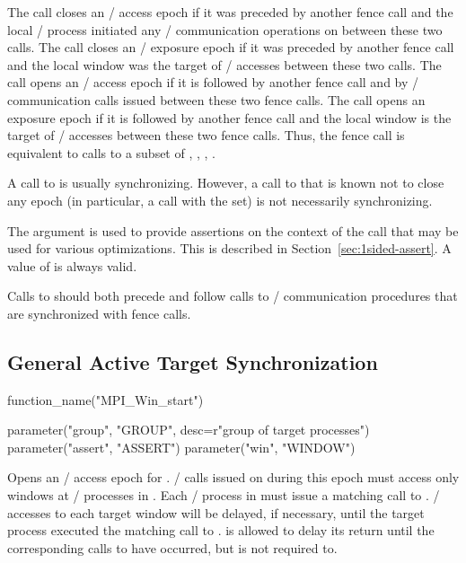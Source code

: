 The call closes an \RMA/ access epoch if it was preceded by
another fence call and the local \mpi/ process initiated any \RMA/ communication
operations on  between these two calls.  The call
closes an \RMA/ exposure epoch if it was
preceded by another fence call and the local window was the target of \RMA/
accesses between these two calls.  The call opens an
\RMA/ access epoch if it is followed by another fence call and by
\RMA/ communication calls issued between these two fence calls.  The
call opens an exposure epoch if it is followed by another fence call
and the local window is the target of \RMA/ accesses between these two fence calls.
Thus, the fence call is equivalent to calls to a subset of
, , , .

A call to  is usually synchronizing.
However, a call to 
that is known not to close any epoch
(in particular, a call with the   set) is
not necessarily synchronizing.

The  argument is used to provide assertions on the
context of the call that may be used for various optimizations.  This
is described in
Section~\ref{sec:1sided-assert}.  A value of  is
always valid.

\begin{users}
Calls to  should both precede and follow calls to
\RMA/ communication procedures that are synchronized with fence calls.
\end{users}

\subsection{General Active Target Synchronization}
\label{sec:1sided-pscw}
\label{sec:1sided-sync:pscw}

%
%
\begin{mpi-binding}
    function_name("MPI_Win_start")
    
    parameter("group", "GROUP", desc=r"group of target processes")
    parameter("assert", "ASSERT")
    parameter("win", "WINDOW")
\end{mpi-binding}

Opens an \RMA/ access epoch for .  \RMA/ calls issued on
 during this epoch must access only windows at
\mpi/ processes in .
Each \mpi/ process in  must issue a matching call to 
.
\RMA/ accesses to each target
window will be delayed, if necessary,
until the target process executed the matching call to 
.
 is allowed to delay its return until the corresponding calls to
 have occurred, but is not required to.

